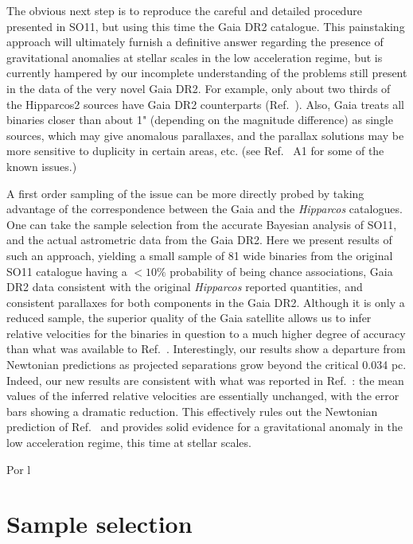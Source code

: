 \documentclass{ws-ijmpd}
\begin{document}
The obvious next step is to reproduce the careful and detailed procedure presented in SO11, but using
this time the Gaia DR2 catalogue. This painstaking approach will ultimately furnish a definitive answer regarding the
presence of gravitational anomalies at stellar scales in the low acceleration regime, but is currently
hampered by our incomplete understanding of the problems still
present in the data of the very novel Gaia DR2. For example, only about two
thirds of the Hipparcos2 sources have Gaia DR2 counterparts (Ref.~). Also, Gaia treats all binaries closer
than about 1" (depending on the magnitude difference) as single sources, which may give anomalous parallaxes, and the
parallax solutions may be more sensitive to duplicity in certain areas, etc. (see
Ref.~ A1 for some of the known issues.)



A first order sampling of the issue can be more directly probed by taking advantage of the correspondence between the
Gaia and the {\it Hipparcos} catalogues. One can take the sample selection from the accurate Bayesian analysis of SO11,
and the actual astrometric data from the Gaia DR2. Here we present results of such an approach, yielding
a small sample of 81 wide binaries from the original SO11 catalogue having a $<10\%$ probability of being chance
associations, Gaia DR2 data consistent with the original {\it Hipparcos} reported quantities, and consistent parallaxes for both
components in the Gaia DR2. Although it is only a reduced sample,
the superior quality of the Gaia satellite allows us to infer relative velocities for the binaries in question
to a much higher degree of accuracy than what was available to Ref.~. Interestingly, our results
show a departure from Newtonian predictions as projected separations grow beyond the critical
0.034 pc. Indeed, our new results are consistent with what was reported in Ref.~: the mean
values of the inferred relative velocities are essentially unchanged, with the error bars showing a dramatic reduction.
This effectively rules out the Newtonian prediction of Ref.~ and provides solid evidence for a gravitational
anomaly in the low acceleration regime, this time at stellar scales.

Por l

\section{Sample selection}
\end{document}
